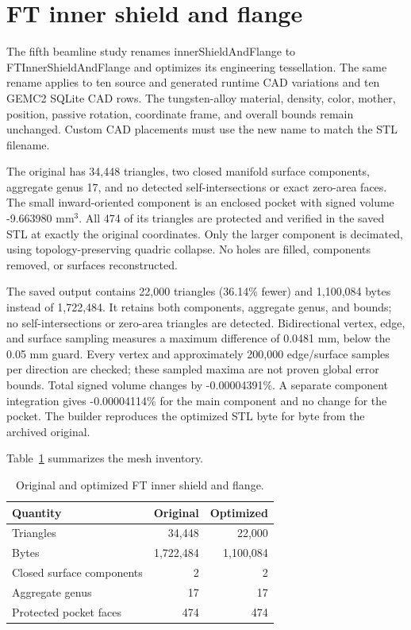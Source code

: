 \FloatBarrier
\section{FT inner shield and flange}

The fifth beamline study renames innerShieldAndFlange to FTInnerShieldAndFlange and optimizes its
engineering tessellation. The same rename applies to ten source and generated runtime CAD variations and ten
GEMC2 SQLite CAD rows. The tungsten-alloy material, density, color, mother, position, passive rotation,
coordinate frame, and overall bounds remain unchanged. Custom CAD placements must use the new name to match
the STL filename.

The original has 34,448 triangles, two closed manifold surface components, aggregate genus 17, and no
detected self-intersections or exact zero-area faces. The small inward-oriented component is an enclosed
pocket with signed volume -9.663980 mm$^3$. All 474 of its triangles are protected and verified in the saved
STL at exactly the original coordinates. Only the larger component is decimated, using topology-preserving
quadric collapse. No holes are filled, components removed, or surfaces reconstructed.

The saved output contains 22,000 triangles (36.14\% fewer) and 1,100,084 bytes instead of 1,722,484. It
retains both components, aggregate genus, and bounds; no self-intersections or zero-area triangles are
detected. Bidirectional vertex, edge, and surface sampling measures a maximum difference of 0.0481 mm, below
the 0.05 mm guard. Every vertex and approximately 200,000 edge/surface samples per direction are checked;
these sampled maxima are not proven global error bounds. Total signed volume changes by -0.00004391\%. A
separate component integration gives -0.00004114\% for the main component and no change for the pocket. The
builder reproduces the optimized STL byte for byte from the archived original.

Table~\ref{tab:inner-shield-meshes} summarizes the mesh inventory.

\begin{table}[htbp]
\centering
\caption{Original and optimized FT inner shield and flange.}
\label{tab:inner-shield-meshes}
\begin{tabular}{lrr}
\toprule
Quantity & Original & Optimized \\
\midrule
Triangles & 34,448 & 22,000 \\
Bytes & 1,722,484 & 1,100,084 \\
Closed surface components & 2 & 2 \\
Aggregate genus & 17 & 17 \\
Protected pocket faces & 474 & 474 \\
\bottomrule
\end{tabular}
\end{table}

